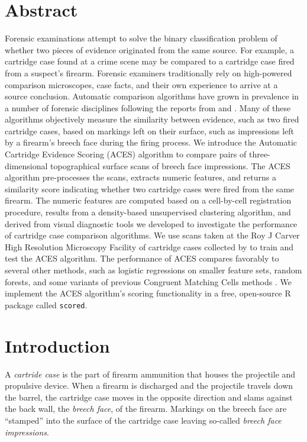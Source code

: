 \documentclass[11pt,]{isuthesis}
\begin{document}
\hypertarget{abstract-2}{%
\section*{Abstract}\label{abstract-2}}

Forensic examinations attempt to solve the binary classification problem of whether two pieces of evidence originated from the same source.
For example, a cartridge case found at a crime scene may be compared to a cartridge case fired from a suspect's firearm.
Forensic examiners traditionally rely on high-powered comparison microscopes, case facts, and their own experience to arrive at a source conclusion.
Automatic comparison algorithms have grown in prevalence in a number of forensic
disciplines following the reports from \citet{council_strengthening_2009} and \citet{pcast2016}.
Many of these algorithms objectively measure the similarity between evidence, such as two fired cartridge cases, based on markings left on their surface, such as impressions left by a firearm's breech face during the firing process.
We introduce the Automatic Cartridge Evidence Scoring (ACES) algorithm to compare pairs of three-dimensional topographical surface scans of breech face impressions.
The ACES algorithm pre-processes the scans, extracts numeric features, and returns a similarity score indicating whether two cartridge cases were fired from the same firearm.
The numeric features are computed based on a cell-by-cell registration procedure, results from a density-based unsupervised clustering algorithm, and derived from visual diagnostic tools we developed to investigate the performance of cartridge case comparison algorithms.
We use scans taken at the Roy J Carver High Resolution Microscopy Facility of cartridge cases collected by \citet{Baldwin2014} to train and test the ACES algorithm.
The performance of ACES compares favorably to several other methods, such as logistic regressions on smaller feature sets, random forests, and some variants of previous Congruent Matching Cells methods \citep{song_proposed_2013, zhang_convergence_2021}.
We implement the ACES algorithm's scoring functionality in a free, open-source R package called \texttt{scored}.

\hypertarget{introduction-1}{%
\section{Introduction}\label{introduction-1}}

A \emph{cartride case} is the part of firearm ammunition that houses the projectile and propulsive device.
When a firearm is discharged and the projectile travels down the barrel, the cartridge case moves in the opposite direction and slams against the back wall, the \emph{breech face}, of the firearm.
Markings on the breech face are ``stamped'' into the surface of the cartridge case leaving so-called \emph{breech face impressions}.
\end{document}
